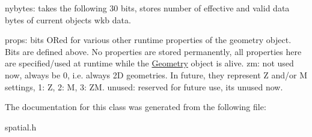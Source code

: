 nybytes\+: takes the following 30 bits, stores number of effective and valid data bytes of current object\textquotesingle{}s wkb data.

props\+: bits OR\textquotesingle{}ed for various other runtime properties of the geometry object. Bits are defined above. No properties are stored permanently, all properties here are specified/used at runtime while the \mbox{\hyperlink{classGeometry}{Geometry}} object is alive. zm\+: not used now, always be 0, i.\+e. always 2D geometries. In future, they represent Z and/or M settings, 1\+: Z, 2\+: M, 3\+: ZM. unused\+: reserved for future use, it\textquotesingle{}s unused now. 

The documentation for this class was generated from the following file\+:\begin{DoxyCompactItemize}
\item 
spatial.\+h\end{DoxyCompactItemize}
